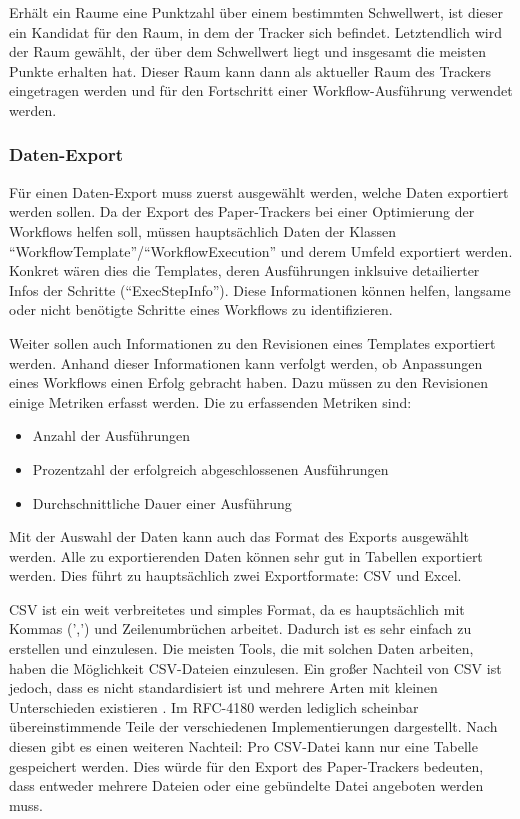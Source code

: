 Erhält ein Raume eine Punktzahl über einem bestimmten Schwellwert, ist dieser ein Kandidat für den Raum, in dem der Tracker
sich befindet.
Letztendlich wird der Raum gewählt, der über dem Schwellwert liegt und insgesamt die meisten Punkte erhalten hat.
Dieser Raum kann dann als aktueller Raum des Trackers eingetragen werden und für den Fortschritt einer Workflow-Ausführung
verwendet werden.

\subsubsection{Daten-Export}

Für einen Daten-Export muss zuerst ausgewählt werden, welche Daten exportiert werden sollen.
Da der Export des Paper-Trackers bei einer Optimierung der Workflows helfen soll, müssen hauptsächlich Daten der
Klassen \enquote{WorkflowTemplate}/\enquote{WorkflowExecution} und derem Umfeld exportiert werden.
Konkret wären dies die Templates, deren Ausführungen inklsuive detailierter Infos der Schritte (\enquote{ExecStepInfo}).
Diese Informationen können helfen, langsame oder nicht benötigte Schritte eines Workflows zu identifizieren.

Weiter sollen auch Informationen zu den Revisionen eines Templates exportiert werden.
Anhand dieser Informationen kann verfolgt werden, ob Anpassungen eines Workflows einen Erfolg gebracht haben.
Dazu müssen zu den Revisionen einige Metriken erfasst werden.
Die zu erfassenden Metriken sind:
\begin{itemize}
	\item Anzahl der Ausführungen
	\item Prozentzahl der erfolgreich abgeschlossenen Ausführungen
	\item Durchschnittliche Dauer einer Ausführung
\end{itemize}

Mit der Auswahl der Daten kann auch das Format des Exports ausgewählt werden.
Alle zu exportierenden Daten können sehr gut in Tabellen exportiert werden.
Dies führt zu hauptsächlich zwei Exportformate: \gls{CSV} und Excel.

\gls{CSV} ist ein weit verbreitetes und simples Format, da es hauptsächlich mit Kommas (',') und Zeilenumbrüchen arbeitet.
Dadurch ist es sehr einfach zu erstellen und einzulesen.
Die meisten Tools, die mit solchen Daten arbeiten, haben die Möglichkeit \gls{CSV}-Dateien einzulesen.
Ein großer Nachteil von \gls{CSV} ist jedoch, dass es nicht standardisiert ist und mehrere Arten
mit kleinen Unterschieden existieren \cite{rfc4180}.
Im RFC-4180 werden lediglich scheinbar übereinstimmende Teile der verschiedenen Implementierungen dargestellt.
Nach diesen gibt es einen weiteren Nachteil: Pro \gls{CSV}-Datei kann nur eine Tabelle gespeichert werden.
Dies würde für den Export des Paper-Trackers bedeuten, dass entweder mehrere Dateien oder eine gebündelte Datei angeboten werden muss.

